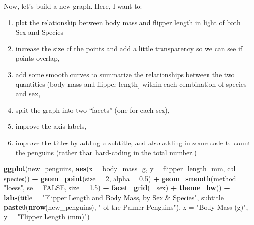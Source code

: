 \documentclass[
]{book}
\newenvironment{Shaded}{\begin{snugshade}}{\end{snugshade}}
\newcommand{\DataTypeTok}[1]{\textcolor[rgb]{0.13,0.29,0.53}{#1}}
\newcommand{\DecValTok}[1]{\textcolor[rgb]{0.00,0.00,0.81}{#1}}
\newcommand{\FloatTok}[1]{\textcolor[rgb]{0.00,0.00,0.81}{#1}}
\newcommand{\KeywordTok}[1]{\textcolor[rgb]{0.13,0.29,0.53}{\textbf{#1}}}
\newcommand{\NormalTok}[1]{#1}
\newcommand{\OperatorTok}[1]{\textcolor[rgb]{0.81,0.36,0.00}{\textbf{#1}}}
\newcommand{\OtherTok}[1]{\textcolor[rgb]{0.56,0.35,0.01}{#1}}
\newcommand{\StringTok}[1]{\textcolor[rgb]{0.31,0.60,0.02}{#1}}
\providecommand{\tightlist}{%
  \setlength{\itemsep}{0pt}\setlength{\parskip}{0pt}}
\begin{document}
Now, let's build a new graph. Here, I want to:

\begin{enumerate}
\def\labelenumi{\arabic{enumi}.}
\tightlist
\item
  plot the relationship between body mass and flipper length in light of both Sex and Species
\item
  increase the size of the points and add a little transparency so we can see if points overlap,
\item
  add some smooth curves to summarize the relationships between the two quantities (body mass and flipper length) within each combination of species and sex,
\item
  split the graph into two ``facets'' (one for each sex),
\item
  improve the axis labels,
\item
  improve the titles by adding a subtitle, and also adding in some code to count the penguins (rather than hard-coding in the total number.)
\end{enumerate}

\begin{Shaded}
\begin{Highlighting}[]
\KeywordTok{ggplot}\NormalTok{(new_penguins, }\KeywordTok{aes}\NormalTok{(}\DataTypeTok{x =}\NormalTok{ body_mass_g, }\DataTypeTok{y =}\NormalTok{ flipper_length_mm, }
                         \DataTypeTok{col =}\NormalTok{ species)) }\OperatorTok{+}
\StringTok{    }\KeywordTok{geom_point}\NormalTok{(}\DataTypeTok{size =} \DecValTok{2}\NormalTok{, }\DataTypeTok{alpha =} \FloatTok{0.5}\NormalTok{) }\OperatorTok{+}\StringTok{ }
\StringTok{    }\KeywordTok{geom_smooth}\NormalTok{(}\DataTypeTok{method =} \StringTok{"loess"}\NormalTok{, }\DataTypeTok{se =} \OtherTok{FALSE}\NormalTok{, }\DataTypeTok{size =} \FloatTok{1.5}\NormalTok{) }\OperatorTok{+}
\StringTok{    }\KeywordTok{facet_grid}\NormalTok{(}\OperatorTok{~}\StringTok{ }\NormalTok{sex) }\OperatorTok{+}
\StringTok{    }\KeywordTok{theme_bw}\NormalTok{() }\OperatorTok{+}\StringTok{ }
\StringTok{    }\KeywordTok{labs}\NormalTok{(}\DataTypeTok{title =} \StringTok{"Flipper Length and Body Mass, by Sex & Species"}\NormalTok{,}
         \DataTypeTok{subtitle =} \KeywordTok{paste0}\NormalTok{(}\KeywordTok{nrow}\NormalTok{(new_penguins), }\StringTok{" of the Palmer Penguins"}\NormalTok{),}
         \DataTypeTok{x =} \StringTok{"Body Mass (g)"}\NormalTok{, }
         \DataTypeTok{y =} \StringTok{"Flipper Length (mm)"}\NormalTok{)}
\end{Highlighting}
\end{Shaded}
\end{document}
